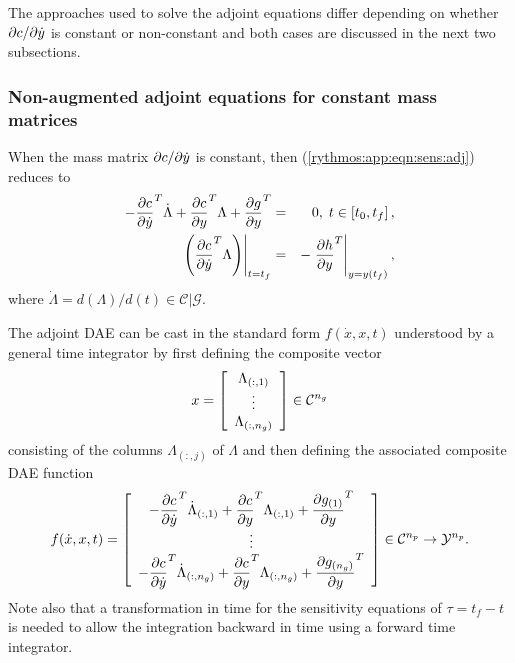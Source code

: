 \documentclass[pdf,ps2pdf,11pt]{SANDreport}
\begin{document}
The approaches used to solve the adjoint equations differ depending on whether
$\jac{c}{\dot{y}}$ is constant or non-constant and both cases are discussed in
the next two subsections.

\subsubsection{Non-augmented adjoint equations for constant mass matrices}

When the mass matrix $\jac{c}{\dot{y}}$ is constant, then
(\ref{rythmos:app:eqn:sens:adj}) reduces to
%
\begin{eqnarray}
- \Jac{c}{\dot{y}}^T \dot{\Lambda}
+  \Jac{c}{y}^T \Lambda + \Jac{g}{y}^T
& = & 0, \; t \in \left[ t_0, t_f \right],
\label{rythmos:app:eqn:sens:adj-const-mass} \\
\left.\left( \Jac{c}{\dot{y}}^T \Lambda \right)\right|_{t=t_f}
& = & - \left. \Jac{h}{y}^T \right|_{y=y(t_f)},
\label{rythmos:app:eqn:sens:adj-const-mass:fc}
\end{eqnarray}
%
where $\dot{\Lambda}=d(\Lambda)/d(t)\in\mathcal{C}|\mathcal{G}$.

The adjoint DAE can be cast in the standard form $f(\dot{x},x,t)$ understood
by a general time integrator by first defining the composite vector
%
\begin{equation}
x =
{\bmat{c}
\Lambda_{(:,1)} \\ \vdots \\ \Lambda_{(:,n_g)}
\emat}
\in \mathcal{C}^{n_g}
\end{equation}
%
consisting of the columns $\Lambda_{(:,j)}$ of $\Lambda$ and then defining the
associated composite DAE function
%
\begin{equation}
f(\dot{x},x,t) =
{\bmat{c}
%
- \Jac{c}{\dot{y}}^T \dot{\Lambda}_{(:,1)}
+  \Jac{c}{y}^T \Lambda_{(:,1)} + \Jac{g_{(1)}}{y}^T
%
\\ \vdots \\
%
- \Jac{c}{\dot{y}}^T \dot{\Lambda}_{(:,n_g)}
+  \Jac{c}{y}^T \Lambda_{(:,n_g)} + \Jac{g_{(n_g)}}{y}^T
%
\emat}
\in \mathcal{C}^{n_p} \rightarrow \mathcal{Y}^{n_p}.
\label{rythmos:eqn:adj-sens-daes}
\end{equation}
%
Note also that a transformation in time for the sensitivity equations of $\tau
= t_f - t$ is needed to allow the integration backward in time using a forward
time integrator.
\end{document}
